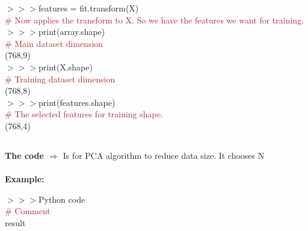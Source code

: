 \documentclass[a4paper,18pt]{article}
\begin{document}
$>>>$features = fit.transform(X)\\{\textcolor{brown}{\# Now applies the transform to X. So we have the features we want for training.}}\\

$>>>$print(array.shape)\\{\textcolor{brown}{\# Main dataset dimension}}\\

\hspace{14pt} (768,9)\\

$>>>$print(X.shape)\\{\textcolor{brown}{\# Training dataset dimension}}\\

\hspace{14pt} (768,8)\\

$>>>$print(features.shape)\\{\textcolor{brown}{\# The selected features for training shape.}}\\

\hspace{14pt} (768,4)\\


\subsection{\colorbox {matgreen}{\color{white}{\large PCA(n\_components=N)}}}
\textbf{The code $\Rightarrow$} Is for PCA algorithm to reduce data size. It chooses N \\\\
\textbf{Example:\\}

$>>>$Python code\\{\textcolor{brown}{\# Comment}}\\

\hspace{14pt} result\\


\subsection{\colorbox {matgreen}{\color{white}{\large OneHotEncoding}}}
\end{document}
